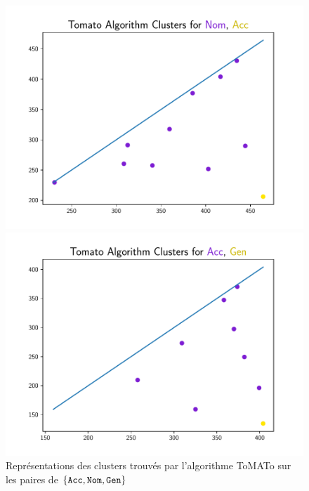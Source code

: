 \documentclass{cours}
\begin{document}
\begin{figure}[H]
        \begin{minipage}{.5\textwidth}
            \begin{center}
                \includegraphics[width=\linewidth]{Figures/Visualisations/tomato_Nom_Acc_Nouns}
            \end{center}
        \end{minipage}
        \begin{minipage}{.5\textwidth}
            \begin{center}
                \includegraphics[width=\linewidth]{Figures/Visualisations/tomato_Acc_Gen_Nouns}
            \end{center}
        \end{minipage}
        \caption{Représentations des clusters trouvés par l'algorithme ToMATo sur les paires de $\{\tt Acc,Nom,Gen\}$}
    \end{figure}
\end{document}
